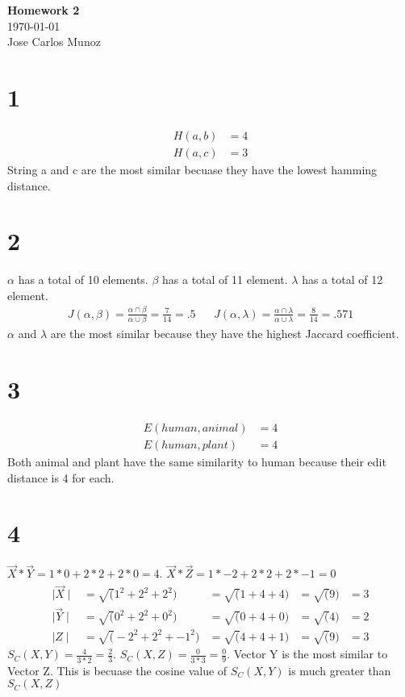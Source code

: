 \documentclass[12pt,english]{article}
\begin{document}
\begin{center}
    \Large
    \textbf{Homework 2}\\
    \small
    \today\\
    \large
    Jose Carlos Munoz
\end{center}
\section*{1}
\begin{align*}
H(a,b) &= 4\\
H(a,c) &= 3
\end{align*}
String a and c are the most similar becuase they have the lowest hamming distance.
\section*{2}
$\alpha$ has a total of 10 elements.
$\beta$ has a total of 11 element.
$\lambda$ has a total of 12 element.
\begin{align*}
J(\alpha, \beta) = \frac{\alpha\cap\beta}{\alpha\cup\beta} =
\frac{7}{14} = .5 & &
J(\alpha, \lambda) = \frac{\alpha\cap\lambda}{\alpha\cup\lambda} =
\frac{8}{14} = .571
\end{align*}
$\alpha$ and $\lambda$ are the most similar because they have the highest Jaccard coefficient.
\section*{3}
\begin{align*}
E(human, animal) &= 4\\
E(human, plant) &= 4
\end{align*}
Both animal and plant have the same similarity to human because their edit distance is 4 for each.
\section*{4}
$\vec{X}*\vec{Y} = 1 * 0 + 2 * 2 + 2 * 0 = 4$.
$\vec{X}*\vec{Z} = 1 * -2 + 2 * 2 + 2 * -1 = 0$
\begin{align*}
\mid \vec{X} \mid &= \sqrt(1^2 + 2^2 + 2^2) &=\sqrt(1 + 4 + 4 ) &=\sqrt(9) &= 3\\
\mid \vec{Y} \mid &= \sqrt(0^2 + 2^2 + 0^2) &=\sqrt(0 + 4 + 0 ) &=\sqrt(4) &= 2\\
\mid Z \mid &= \sqrt(-2^2 + 2^2 + -1^2) &=\sqrt(4 + 4 + 1 ) &=\sqrt(9) &= 3
\end{align*}
$S_C(X,Y) = \frac{4}{3 * 2} = \frac{2}{3}$.
$S_C(X,Z) = \frac{0}{3 * 3} = \frac{0}{9}$.
Vector Y is the most similar to Vector Z. This is becuase the cosine value of $S_C(X,Y)$ is much greater than $S_C(X,Z)$
\end{document}
